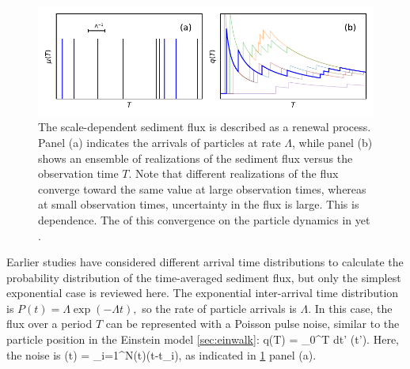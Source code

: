  \begin{figure}[!htbp]
	\includegraphics[width=\linewidth,keepaspectratio]{./figures/ch1/anceyRenewal.pdf}
	\caption{The scale-dependent sediment flux is described as a renewal process. Panel (a) indicates the arrivals of particles at rate $\Lambda$, while panel (b) shows an ensemble of realizations of the sediment flux versus the observation time $T$. Note that different realizations of the flux converge toward the same value at large observation times, whereas at small observation times, uncertainty in the flux is large. This is \DIFdelbeginFL {}\DIFdelendFL \DIFaddbeginFL {}\DIFaddendFL dependence. The \DIFdelbeginFL {}\DIFdelendFL \DIFaddbeginFL {}\DIFaddendFL of this convergence \DIFdelbeginFL {}\DIFdelendFL \DIFaddbeginFL {}\DIFaddendFL on the particle dynamics in \DIFdelbeginFL {}\DIFdelendFL \DIFaddbeginFL {}\DIFaddendFL yet \DIFdelbeginFL {}\DIFdelendFL \DIFaddbeginFL {}\DIFaddendFL . }
	\label{fig:ancey}
\end{figure}
Earlier studies have considered different arrival time distributions to calculate the probability distribution of the time-averaged sediment flux, but only the simplest exponential case is reviewed here. The exponential inter-arrival time distribution is $P(t) = \Lambda \exp(-\Lambda t),$ so the rate of particle arrivals is $\Lambda$.
In this case, the flux \DIFdelbegin {}\DIFdelend \DIFaddbegin {}\DIFaddend over a period $T$ can be represented with a Poisson pulse noise, similar to the particle position in the Einstein model \DIFdelbegin {}\DIFdelend \DIFaddbegin {}\DIFaddend \ref{sec:einwalk}:
\be q(T) = \int_0^T dt' \mu(t'). \label{eq:flucflux}\ee
Here, the noise is 
\be \mu(t) = \sum_{i=1}^{N(t)}\delta(t-t_i), \label{eq:poissfluxnoise}\ee
as indicated in \DIFdelbegin {}\DIFdelend \DIFaddbegin {}\DIFaddend \ref{fig:ancey} panel (a). 
